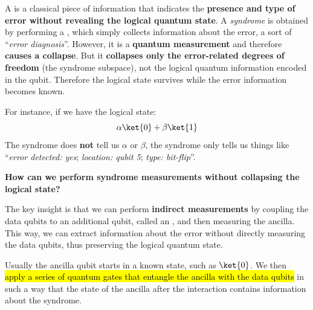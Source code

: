 \highspace
\begin{definitionbox}[: Syndrome]
    A  is a classical piece of information that indicates the \textbf{presence and type of error without revealing the logical quantum state}. A \emph{syndrome} is obtained by performing a , which simply collects information about the error, a sort of ``\emph{error diagnosis}''. However, it is a \textbf{quantum measurement} and therefore \textbf{causes a collapse}. But it \textbf{collapses only the error-related degrees of freedom} (the syndrome subspace), not the logical quantum information encoded in the qubit. Therefore the logical state survives while the error information becomes known.

    \highspace
    For instance, if we have the logical state:
    \begin{equation*}
        \alpha\ket{0} + \beta\ket{1}
    \end{equation*}
    The syndrome does \textbf{not} tell us $\alpha$ or $\beta$, the syndrome only tells us things like ``\emph{error detected: yes}; \emph{location: qubit 5}; \emph{type: bit-flip}''.
\end{definitionbox}

\begin{flushleft}
    \textcolor{Green3}{ \textbf{How can we perform syndrome measurements without collapsing the logical state?}}
\end{flushleft}
The key insight is that we can perform \textbf{indirect measurements} by coupling the data qubits to an additional qubit, called an , and then measuring the ancilla. This way, we can extract information about the error without directly measuring the data qubits, thus preserving the logical quantum state.

\highspace
Usually the ancilla qubit starts in a known state, such as $\ket{0}$. We then \hl{apply a series of quantum gates that entangle the ancilla with the data qubits} in such a way that the state of the ancilla after the interaction contains information about the syndrome.

